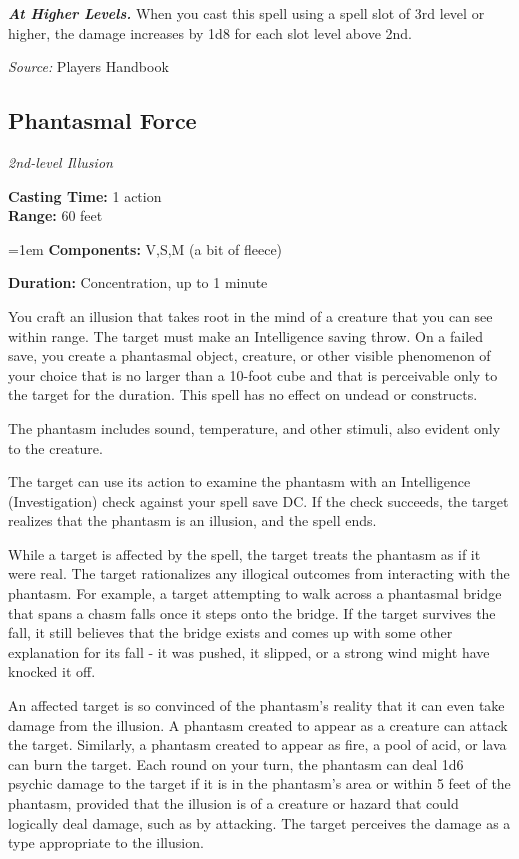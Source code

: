 \documentclass[10pt,twoside,twocolumn]{article}
\begin{document}
\textbf{\textit{At Higher Levels.}} When you cast this spell using a spell slot of 3rd level or higher, the damage increases by 1d8 for each slot level above 2nd.


\textit{Source:} Players Handbook

\subsection{Phantasmal Force}
\textit{2nd-level Illusion}
\smallskip

\noindent
\textbf{Casting Time:}  1 action\\
\textbf{Range:}  60 feet

\noindent
\hangindent=1em
\textbf{Components:}  V,S,M (a bit of fleece)

\noindent
\textbf{Duration:}  Concentration, up to 1 minute\\
\smallskip



You craft an illusion that takes root in the mind of a creature that you can see within range. The target must make an Intelligence saving throw. On a failed save, you create a phantasmal object, creature, or other visible phenomenon of your choice that is no larger than a 10-foot cube and that is perceivable only to the target for the duration. This spell has no effect on undead or constructs.

The phantasm includes sound, temperature, and other stimuli, also evident only to the creature.

The target can use its action to examine the phantasm with an Intelligence (Investigation) check against your spell save DC. If the check succeeds, the target realizes that the phantasm is an illusion, and the spell ends.

While a target is affected by the spell, the target treats the phantasm as if it were real. The target rationalizes any illogical outcomes from interacting with the phantasm. For example, a target attempting to walk across a phantasmal bridge that spans a chasm falls once it steps onto the bridge. If the target survives the fall, it still believes that the bridge exists and comes up with some other explanation for its fall - it was pushed, it slipped, or a strong wind might have knocked it off.

An affected target is so convinced of the phantasm's reality that it can even take damage from the illusion. A phantasm created to appear as a creature can attack the target. Similarly, a phantasm created to appear as fire, a pool of acid, or lava can burn the target. Each round on your turn, the phantasm can deal 1d6 psychic damage to the target if it is in the phantasm's area or within 5 feet of the phantasm, provided that the illusion is of a creature or hazard that could logically deal damage, such as by attacking. The target perceives the damage as a type appropriate to the illusion.
\end{document}
